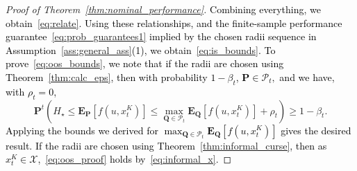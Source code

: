 \documentclass[12pt]{article}
\newcommand{\IrinaNote}[1]{\textcolor{red}{\textbf{[I: #1]}}}
\newcommand{\prob}{{\mathbf P}}
\newcommand{\unc}{u}
\newcommand{\eps}{\varepsilon^K}
\newcommand{\epsnom}{\varepsilon}
\newcommand{\RC}[1]{\textcolor{black}{#1}}
\newcommand{\RC}[1]{\textcolor{blue}{#1}}
\begin{document}
\begin{proof}[Proof of Theorem~\ref{thm:nominal_performance}]
\RC{Combining everything, we obtain~\eqref{eq:relate}.} \RC{Using these relationships, and the finite-sample performance guarantee~\eqref{eq:prob_guarantees1} implied by the chosen radii sequence in Assumption~\ref{ass:general_ass}(1), we obtain~\eqref{eq:is_bounds}.} \RC{To prove~\eqref{eq:oos_bounds}, we note that if the radii are chosen using Theorem~\ref{thm:calc_eps}, then with probability $1 - \beta_{t}$, $\prob \in \mathcal{P}_{t},$ and we have, with $\rho_{t}=0$,}
\begin{equation}
\label{eq:oos_proof}
        \prob^{{t}}\left( H_\star \leq \mathbf{E}_{\mathbf{P}}[f(\unc, x^K_{t})] \leq \max_{\mathbf{Q} \in \mathcal{P}_{t}} \mathbf{E}_{\mathbf{Q}}[f(\unc, x^K_{t})] + \rho_{t}\right) \geq 1 - \beta_{t}.
\end{equation}
\RC{Applying the bounds we derived for $\max_{\mathbf{Q} \in \mathcal{P}_{t}} \mathbf{E}_{\mathbf{Q}}[f(\unc, x^K_{t})]$ gives the desired result.} \RC{If the radii are chosen using Theorem~\ref{thm:informal_curse}, then as $x^K_t \in \mathcal{X}$,~\eqref{eq:oos_proof} holds by~\eqref{eq:informal_x}.}
\end{proof}
\ifsiam
\newpage
\fi
\end{document}
